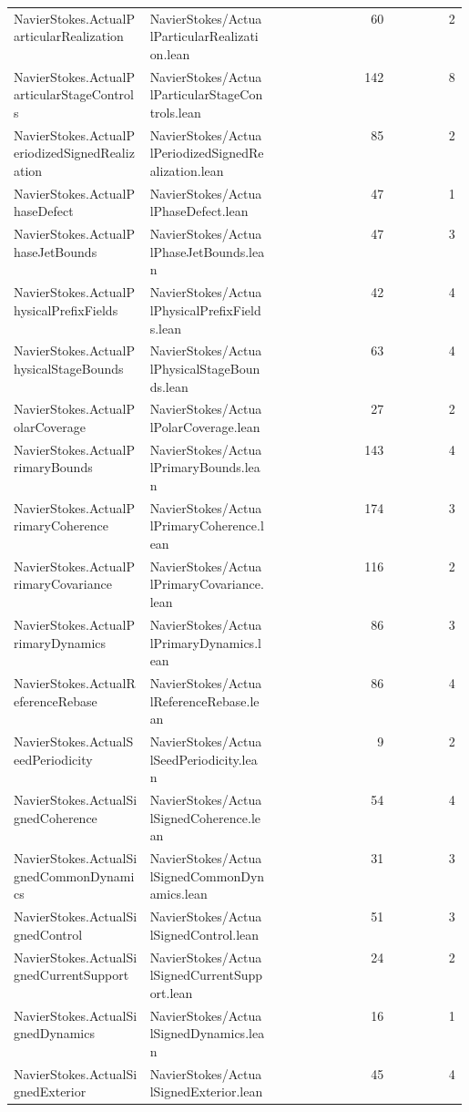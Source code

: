 \begin{longtable}{p{0.30\linewidth}p{0.28\linewidth}rr}
NavierStokes.ActualParticularRealization & NavierStokes/ActualParticularRealization.lean & 60 & 2\\
NavierStokes.ActualParticularStageControls & NavierStokes/ActualParticularStageControls.lean & 142 & 8\\
NavierStokes.ActualPeriodizedSignedRealization & NavierStokes/ActualPeriodizedSignedRealization.lean & 85 & 2\\
NavierStokes.ActualPhaseDefect & NavierStokes/ActualPhaseDefect.lean & 47 & 1\\
NavierStokes.ActualPhaseJetBounds & NavierStokes/ActualPhaseJetBounds.lean & 47 & 3\\
NavierStokes.ActualPhysicalPrefixFields & NavierStokes/ActualPhysicalPrefixFields.lean & 42 & 4\\
NavierStokes.ActualPhysicalStageBounds & NavierStokes/ActualPhysicalStageBounds.lean & 63 & 4\\
NavierStokes.ActualPolarCoverage & NavierStokes/ActualPolarCoverage.lean & 27 & 2\\
NavierStokes.ActualPrimaryBounds & NavierStokes/ActualPrimaryBounds.lean & 143 & 4\\
NavierStokes.ActualPrimaryCoherence & NavierStokes/ActualPrimaryCoherence.lean & 174 & 3\\
NavierStokes.ActualPrimaryCovariance & NavierStokes/ActualPrimaryCovariance.lean & 116 & 2\\
NavierStokes.ActualPrimaryDynamics & NavierStokes/ActualPrimaryDynamics.lean & 86 & 3\\
NavierStokes.ActualReferenceRebase & NavierStokes/ActualReferenceRebase.lean & 86 & 4\\
NavierStokes.ActualSeedPeriodicity & NavierStokes/ActualSeedPeriodicity.lean & 9 & 2\\
NavierStokes.ActualSignedCoherence & NavierStokes/ActualSignedCoherence.lean & 54 & 4\\
NavierStokes.ActualSignedCommonDynamics & NavierStokes/ActualSignedCommonDynamics.lean & 31 & 3\\
NavierStokes.ActualSignedControl & NavierStokes/ActualSignedControl.lean & 51 & 3\\
NavierStokes.ActualSignedCurrentSupport & NavierStokes/ActualSignedCurrentSupport.lean & 24 & 2\\
NavierStokes.ActualSignedDynamics & NavierStokes/ActualSignedDynamics.lean & 16 & 1\\
NavierStokes.ActualSignedExterior & NavierStokes/ActualSignedExterior.lean & 45 & 4\\

\end{longtable}
